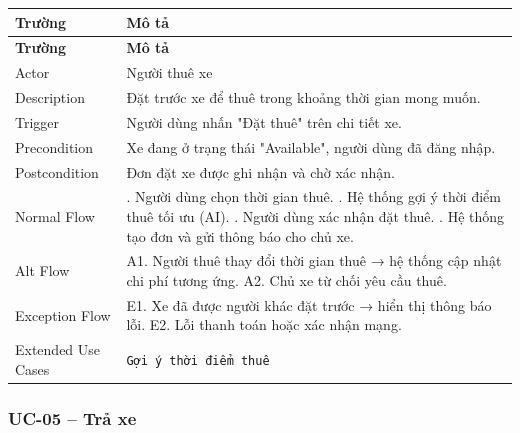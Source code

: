 \begin{longtable}{|>{\raggedright\arraybackslash}p{4cm}|>{\raggedright\arraybackslash}p{11cm}|}
\hline
\textbf{Trường} & \textbf{Mô tả} \\
\hline
\endfirsthead

\hline
\textbf{Trường} & \textbf{Mô tả} \\
\hline
\endhead

\hline
\endfoot

Actor & Người thuê xe \\
\hline
Description & Đặt trước xe để thuê trong khoảng thời gian mong muốn. \\
\hline
Trigger & Người dùng nhấn "Đặt thuê" trên chi tiết xe. \\
\hline
Precondition & Xe đang ở trạng thái "Available", người dùng đã đăng nhập. \\
\hline
Postcondition & Đơn đặt xe được ghi nhận và chờ xác nhận. \\
\hline
Normal Flow & 1. Người dùng chọn thời gian thuê. \newline 2. Hệ thống gợi ý thời điểm thuê tối ưu (AI). \newline 3. Người dùng xác nhận đặt thuê. \newline 4. Hệ thống tạo đơn và gửi thông báo cho chủ xe. \\
\hline
Alt Flow & A1. Người thuê thay đổi thời gian thuê → hệ thống cập nhật chi phí tương ứng. \newline A2. Chủ xe từ chối yêu cầu thuê. \\
\hline
Exception Flow & E1. Xe đã được người khác đặt trước → hiển thị thông báo lỗi. \newline E2. Lỗi thanh toán hoặc xác nhận mạng. \\
\hline
Extended Use Cases & \texttt{Gợi ý thời điểm thuê} \\
\hline
\end{longtable}

\subsubsection*{UC-05 – Trả xe}

